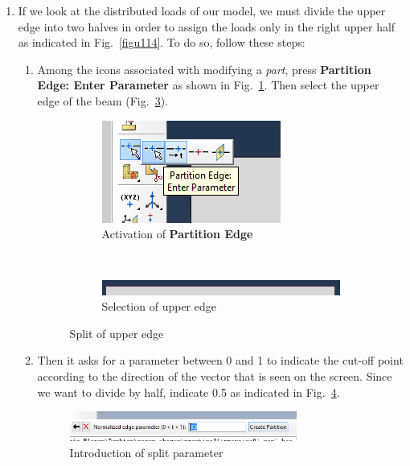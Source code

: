 \begin{enumerate}
\item If we look at the distributed loads of our model, we must divide
  the upper edge into two halves in order to assign the loads only in
  the right upper half as indicated in Fig.~\ref{figu114}. To do so, follow
  these steps:
  \begin{enumerate}
  \item Among the icons associated with modifying a \textit{part},
    press \textbf{Partition Edge: Enter Parameter} as shown in
    Fig.~\ref {figu34}. Then select the upper edge of the beam
    (Fig.~\ref{figu35}).
    \begin{figure}[H]
      \centering
      \begin{subfigure}{0.29\textwidth}
        \includegraphics[width=\textwidth]{./body/images/imagen34}
        \caption{Activation of \textbf{Partition Edge}}
        \label{figu34}
      \end{subfigure}%
      ~ %
      \begin{subfigure}{0.59\textwidth}
        \includegraphics[width=\textwidth]{./body/images/imagen35}
        \caption{Selection of upper edge}
        \label{figu35}
      \end{subfigure}%
      \caption{Split of upper edge}
    \end{figure}
  \item Then it asks for a parameter between 0 and 1 to indicate the
    cut-off point according to the direction of the vector that is
    seen on the screen. Since we want to divide by half, indicate 0.5
    as indicated in Fig.~\ref{figu36}.
    \begin{figure}[!h]
      \begin{center}
        \includegraphics[width=0.75\textwidth]{./body/images/imagen36}
      \end{center}
      \caption{Introduction of split parameter}
      \label{figu36}
    \end{figure}
  \end{enumerate}
\end{enumerate}
